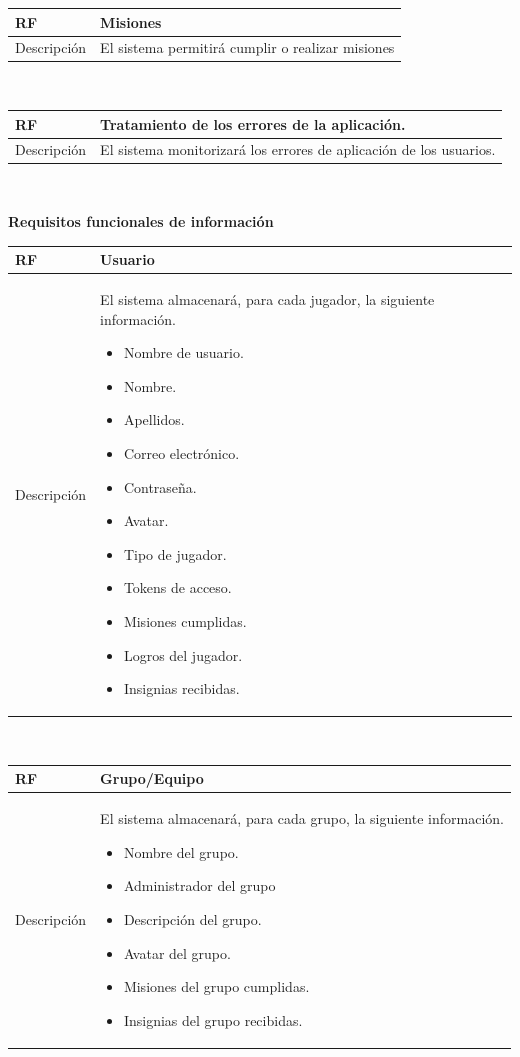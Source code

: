 \documentclass[twoside]{report}
\newcommand\addrow[2]{#1 &#2\\ }
\newcommand\addheading[2]{#1 &#2\\ \hline}
\newcommand\tabularhead{\begin{tabular}{lp{0.7\textwidth}}
\hline
}
\newenvironment{req}{\tabularhead}
{\hline\end{tabular}}
\begin{document}
\begin{req}
	\addheading{\textbf{RF\arabic{functionalRequirements}}}{Misiones}
	\addrow{Descripción}{El sistema permitirá cumplir o realizar misiones}
\end{req}\\

\begin{req}
	\addheading{\textbf{RF\arabic{functionalRequirements}}}{Tratamiento de los errores de la aplicación.}
	\addrow{Descripción}{El sistema monitorizará los errores de aplicación de los usuarios.}
\end{req}\\

\textbf{Requisitos funcionales de información}\\

\begin{req}
	\addheading{\textbf{RF\arabic{functionalRequirements}}}{Usuario}
	\addrow{Descripción}{
	El sistema almacenará, para cada jugador, la siguiente información.
	\begin{multicols}{2}
	\begin{itemize}
		\item Nombre de usuario.
		\item Nombre.
		\item Apellidos.
		\item Correo electrónico.
		\item Contraseña.
		\item Avatar.
		\item Tipo de jugador.
		\item Tokens de acceso.
		\item Misiones cumplidas.
		\item Logros del jugador.
		\item Insignias recibidas.
	\end{itemize}
	\end{multicols}
	}
\end{req}\\

\begin{req}
	\addheading{\textbf{RF\arabic{functionalRequirements}}}{Grupo/Equipo}
	\addrow{Descripción}{
	El sistema almacenará, para cada grupo, la siguiente información.
	\begin{multicols}{2}
	\begin{itemize}
		\item Nombre del grupo.
		\item Administrador del grupo
		\item Descripción del grupo.
		\item Avatar del grupo.
		\item Misiones del grupo cumplidas.
		\item Insignias del grupo recibidas.
	\end{itemize}
	\end{multicols}
	}
\end{req}\\
\end{document}
